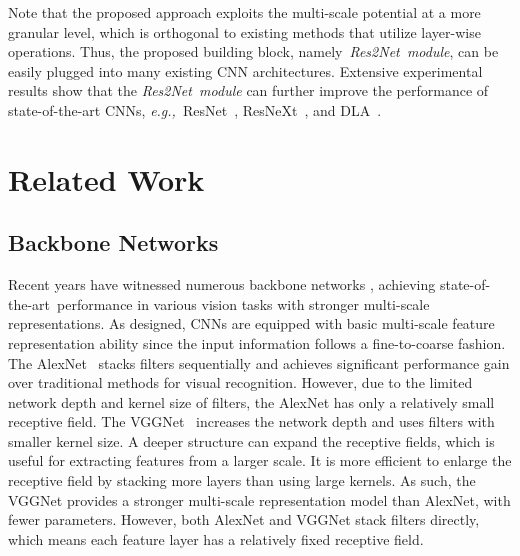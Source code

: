 \documentclass[10pt,journal,cspaper,compsoc]{IEEEtran}
\newcommand{\figref}[1]{Figure 1}%
\newcommand{\figref}[1]{Fig.~\ref{#1}}%
\newcommand{\ourM}{{Res2Net}}
\newcommand{\sArt}{{state-of-the-art~}}
\def\eg{\emph{e.g.,~}}
\begin{document}
Note that the proposed approach exploits the multi-scale
potential at a more granular level,
which is orthogonal to existing methods that utilize layer-wise operations.
%
Thus, the proposed building block, namely~\emph{\ourM~module},
can be easily plugged into many existing CNN architectures.
%
Extensive experimental results show that the \emph{\ourM~module} can further improve
the performance of state-of-the-art CNNs,
\eg ResNet~\cite{he2016deep}, ResNeXt~\cite{xie2017aggregated},
and DLA~\cite{yu2018deep}.



\section{Related Work}

\subsection{Backbone Networks}

Recent years have witnessed numerous backbone networks
\cite{krizhevsky2012imagenet,simonyan2014very,szegedy2015going,he2016deep,
huang2017densely,Chollet_2017_CVPR,xie2017aggregated,yu2018deep},
achieving \sArt performance in various vision tasks
with stronger multi-scale representations.
%
As designed, CNNs are equipped with basic multi-scale 
feature representation ability
since the input information follows a fine-to-coarse fashion.
%
The AlexNet~\cite{krizhevsky2012imagenet} stacks filters
sequentially and achieves significant performance gain
over traditional methods for visual recognition.
%
However, due to the limited network depth and kernel size of filters,
the AlexNet has only a relatively small receptive field.
%
The VGGNet~\cite{simonyan2014very} increases the network depth and uses filters
with smaller kernel size.
%
A deeper structure can expand the receptive fields,
which is useful for extracting features from a larger scale.
%
It is more efficient to enlarge the receptive field
by stacking more layers than using large kernels.
%
As such, the VGGNet provides a stronger multi-scale representation model
than AlexNet,
with fewer parameters.
%
However, both AlexNet and VGGNet stack filters directly, 
which means each feature layer has a relatively fixed receptive field.
\end{document}

